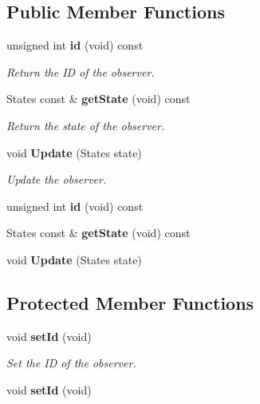 \subsection*{Public Member Functions}
\begin{DoxyCompactItemize}
\item 
unsigned int {\bf id} (void) const 
\begin{DoxyCompactList}\small\item\em Return the I\+D of the observer. \end{DoxyCompactList}\item 
States const \& {\bf get\+State} (void) const 
\begin{DoxyCompactList}\small\item\em Return the state of the observer. \end{DoxyCompactList}\item 
void {\bf Update} (States state)
\begin{DoxyCompactList}\small\item\em Update the observer. \end{DoxyCompactList}\item 
unsigned int {\bfseries id} (void) const \label{class_g_a_1_1_a_observer_a179703ea106637547da70a66ec69c0d0}

\item 
States const \& {\bfseries get\+State} (void) const \label{class_g_a_1_1_a_observer_a8a91bd8e4d3a673e82a46608361132f3}

\item 
void {\bfseries Update} (States state)\label{class_g_a_1_1_a_observer_a6d70fb2f1fa04407125f62cde1d932b5}

\end{DoxyCompactItemize}
\subsection*{Protected Member Functions}
\begin{DoxyCompactItemize}
\item 
void {\bf set\+Id} (void)\label{class_g_a_1_1_a_observer_a2c51ab020eeea35b56de2e8639515c01}

\begin{DoxyCompactList}\small\item\em Set the I\+D of the observer. \end{DoxyCompactList}\item 
void {\bfseries set\+Id} (void)\label{class_g_a_1_1_a_observer_a2c51ab020eeea35b56de2e8639515c01}

\end{DoxyCompactItemize}
